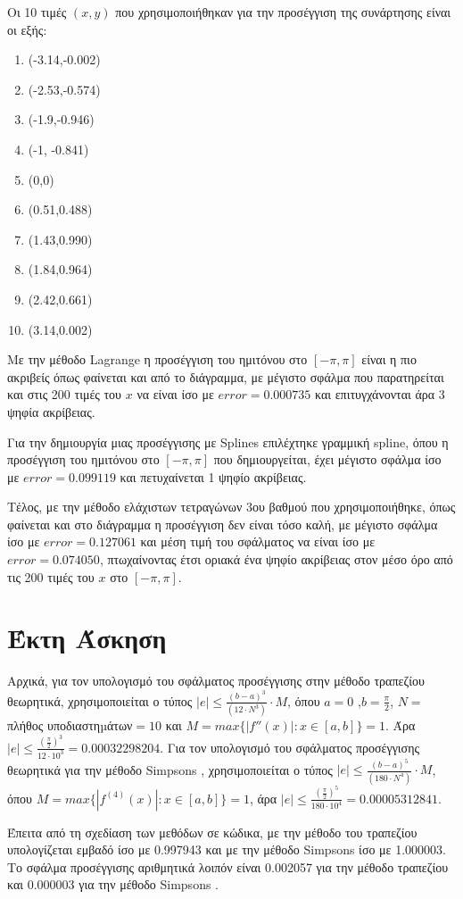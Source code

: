 \documentclass[a4paper,11pt]{article}
\newcommand{\lt}{\latintext}
\newcommand{\gt}{\greektext}
\begin{document}
\newpage
Οι 10 τιμές $(x,y)$ που χρησιμοποιήθηκαν για την προσέγγιση της συνάρτησης είναι οι εξής:
\begin{enumerate}

    \item (-3.14,-0.002)
    \item (-2.53,-0.574)
    \item (-1.9,-0.946)
    \item (-1,	-0.841)
    \item (0,0)
    \item (0.51,0.488)
    \item (1.43,0.990)
    \item (1.84,0.964)
    \item (2.42,0.661)
    \item (3.14,0.002)
\end{enumerate}
Με την μέθοδο Lagrange η προσέγγιση του ημιτόνου στο $[-\pi,\pi]$ είναι η πιο ακριβείς όπως φαίνεται και από το διάγραμμα, με μέγιστο σφάλμα που παρατηρείται και στις 200 τιμές του $x$ να είναι ίσο με $error=0.000735$ και επιτυγχάνονται άρα 3 ψηφία ακρίβειας. \par
Για την δημιουργία μιας προσέγγισης με Splines επιλέχτηκε γραμμική spline, όπου η προσέγγιση του ημιτόνου στο $[-\pi,\pi]$ που δημιουργείται, έχει μέγιστο σφάλμα ίσο με $error=0.099119$ και πετυχαίνεται 1 ψηφίο ακρίβειας. \par
Τέλος, με την μέθοδο ελάχιστων τετραγώνων 3ου βαθμού που χρησιμοποιήθηκε, όπως φαίνεται και στο διάγραμμα η προσέγγιση δεν είναι τόσο καλή, με μέγιστο σφάλμα ίσο με $error=0.127061$ και μέση τιμή του σφάλματος να είναι ίσο με $error=0.074050$, πτωχαίνοντας έτσι οριακά ένα ψηφίο ακρίβειας στον μέσο όρο από τις 200 τιμές του $x$ στο $[-\pi,\pi]$.


\newpage 
\section{Έκτη Άσκηση}
Αρχικά, για τον υπολογισμό του σφάλματος προσέγγισης στην μέθοδο τραπεζίου θεωρητικά, χρησιμοποιείται ο 
τύπος $|e| \leq \frac{(b-a)^3}{(12\cdot N^3)}\cdot M$, 
όπου $a=0$ ,$b=\frac{\pi}{2}$, $N=$πλήθος υποδιαστηµάτων$=10$ και 
$Μ=max\{|f''(x)|:x\in[a,b]\}=1$. Άρα $|e| \leq \frac{(\frac{\pi}{2})^3}
{12\cdot 10^3} = 0.00032298204$. Για τον υπολογισμό του σφάλματος προσέγγισης θεωρητικά για την μέθοδο \lt Simpsons \gt, χρησιμοποιείται ο 
τύπος  $|e| \leq \frac{(b-a)^5}{(180\cdot N^4)}\cdot M$, όπου $Μ=max\{|f^{(4)}(x)|:x\in[a,b]\}=1$, άρα  $|e| \leq \frac{(\frac{\pi}{2})^5}
{180\cdot 10^4} = 0.00005312841$.\par 
Έπειτα από τη σχεδίαση των μεθόδων σε κώδικα, με την μέθοδο του τραπεζίου 
υπολογίζεται εμβαδό ίσο με 0.997943 και με την μέθοδο Simpsons ίσο με 
1.000003. Το σφάλμα προσέγγισης αριθμητικά λοιπόν είναι 0.002057 για την μέθοδο 
τραπεζίου και 0.000003 για την μέθοδο \lt Simpsons \gt.
\end{document}
